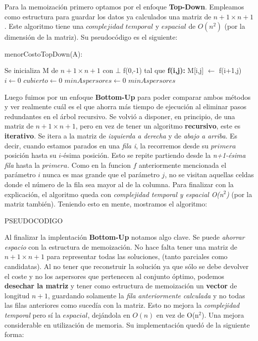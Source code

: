 \documentclass[./main.tex]{subfiles}
\begin{document}
Para la memoización primero optamos por el enfoque \textbf{Top-Down}. Empleamos como estructura para guardar los datos ya calculados una matriz de $n+1 \times n+1$. Este algoritmo tiene una $complejidad$ $temporal$ y $espacial$ de $O(n^{2})$ (por la dimensión de la matriz). Su pseudocódigo es el siguiente:
\newline

\begin{algorithm}
\caption{menorCostoTopDown(A):}
\begin{algorithmic} 
\STATE Se inicializa M de $n+1 \times n+1$ con \(\bot\)
\RETURN f(0,-1) tal que
\STATE \textbf{f(i,j):}
\ENDIF
{}
\ENDIF
{}
\STATE M[i,j] \(\leftarrow\) f(i+1,j) 
\ENDIF
\ENDIF
\STATE $i \leftarrow 0$
\STATE $cubierto \leftarrow 0$
\STATE $minAspersores \leftarrow 0$
\RETURN $minAspersores$
\end{algorithmic}
\end{algorithm}

Luego fuimos por un enfoque \textbf{Bottom-Up} para poder comparar ambos métodos y ver realmente cuál es el que ahorra más tiempo de ejecución al eliminar pasos redundantes en el árbol recursivo. Se volvió a disponer, en principio, de una matriz de $n+1 \times n+1$, pero en vez de tener un algoritmo \textbf{recursivo}, este es \textbf{iterativo}. Se itera a la matriz de \textit{izquierda a derecha} y de \textit{abajo a arriba}. Es decir, cuando estamos parados en una \textit{fila i}, la recorremos desde su $primera$ posición hasta su \(i\)-ésima posición. Esto se repite partiendo desde la \textit{n+1-ésima fila} hasta la $primera$. Como en la funcion $f$ anteriormente mencionada el parámetro $i$ nunca es mas grande que el parámetro $j$, no se visitan aquellas celdas donde el número de la fila sea mayor al de la columna. Para finalizar con la explicación, el algoritmo queda con \textit{complejidad temporal y espacial O(n$^{2}$)} (por la matriz también). Teniendo esto en mente, mostramos el algoritmo:
\newline

PSEUDOCODIGO
\newline

Al finalizar la implentación \textbf{Bottom-Up} notamos algo clave. Se puede \textit{ahorrar espacio} con la estructura de memoización. No hace falta tener una matriz de $n+1 \times n+1$ para representar todas las soluciones, (tanto parciales como candidatas). Al no tener que reconstruir la solución ya que sólo se debe devolver el coste y no los aspersores que pertenecen al conjunto óptimo, podemos \textbf{desechar la matriz} y tener como estructura de memoización un \textbf{vector} de longitud $n+1$, guardando solamente la \textit{fila anteriormente calculada} y no todas las filas anteriores como sucedía con la matriz. Esto no mejora la \textit{complejidad temporal} pero sí la $espacial$, dejándola en $O(n)$ en vez de O(n$^{2}$). Una mejora considerable en utilización de memoria. Su implementación quedó de la siguiente forma:
\newline
\end{document}
